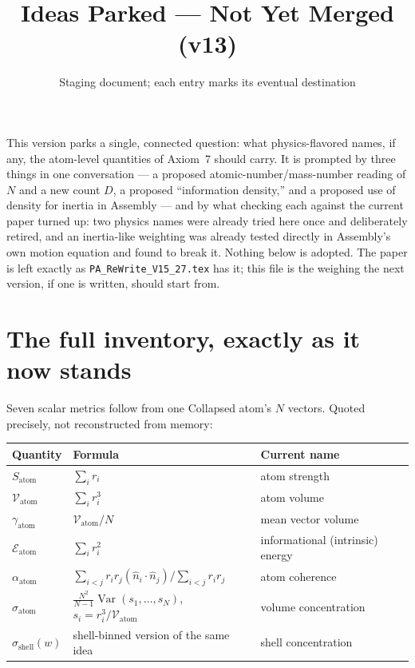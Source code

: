 \documentclass[11pt]{article}
\title{Ideas Parked --- Not Yet Merged (v13)}
\author{Staging document; each entry marks its eventual destination}
\date{}
\begin{document}
\maketitle

\noindent This version parks a single, connected question: what
physics-flavored names, if any, the atom-level quantities of
Axiom~7 should carry. It is prompted by three things in one
conversation --- a proposed atomic-number/mass-number reading of $N$
and a new count $D$, a proposed ``information density,'' and a
proposed use of density for inertia in Assembly --- and by what
checking each against the current paper turned up: two physics names
were already tried here once and deliberately retired, and an
inertia-like weighting was already tested directly in Assembly's own
motion equation and found to break it. Nothing below is adopted.
The paper is left exactly as \texttt{PA\_ReWrite\_V15\_27.tex} has
it; this file is the weighing the next version, if one is written,
should start from.

\section{The full inventory, exactly as it now stands}

Seven scalar metrics follow from one Collapsed atom's $N$ vectors.
Quoted precisely, not reconstructed from memory:

\begin{center}
\begin{tabular}{lll}
Quantity & Formula & Current name \\
\hline
$S_{\text{atom}}$ & $\sum_i r_i$ & atom strength \\
$\mathcal{V}_{\text{atom}}$ & $\sum_i r_i^3$ & atom volume \\
$\gamma_{\text{atom}}$ & $\mathcal{V}_{\text{atom}}/N$ & mean vector volume \\
$\mathcal{E}_{\text{atom}}$ & $\sum_i r_i^2$ & informational (intrinsic) energy \\
$\alpha_{\text{atom}}$ & $\sum_{i<j} r_ir_j(\hat n_i\!\cdot\!\hat n_j)\big/\sum_{i<j}r_ir_j$ & atom coherence \\
$\sigma_{\text{atom}}$ & $\frac{N^2}{N-1}\operatorname{Var}(s_1,\ldots,s_N)$, $s_i=r_i^3/\mathcal{V}_{\text{atom}}$ & volume concentration \\
$\sigma_{\text{shell}}(w)$ & shell-binned version of the same idea & shell concentration \\
\end{tabular}
\end{center}
\end{document}
